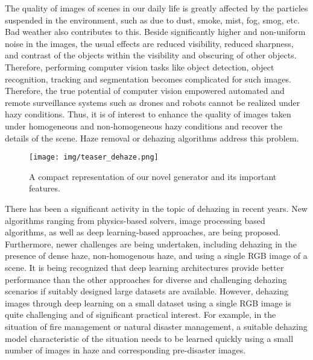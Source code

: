 \documentclass[runningheads]{llncs}
\begin{document}
The quality of images of scenes in our daily life is greatly affected by the particles suspended in the environment, such as due to dust, smoke, mist, fog, smog, etc. Bad weather also contributes to this. Beside significantly higher and non-uniform noise in the images, the usual effects are reduced visibility, reduced sharpness, and contrast of the objects within the visibility and obscuring of other objects. Therefore, performing computer vision tasks like object detection, object recognition, tracking and segmentation becomes complicated for such images. Therefore, the true potential of computer vision empowered automated and remote surveillance systems such as drones and robots cannot be realized under hazy conditions. Thus, it is of interest to enhance the quality of images taken under homogeneous and non-homogeneous hazy conditions and recover the details of the scene. Haze removal or dehazing algorithms address this problem.

\begin{figure}[t]
\centering
\texttt{[image: img/teaser\_dehaze.png]}
\vspace{-3pt}
\caption{A compact representation of our novel generator and its important features.}
\label{img:UNet}
\end{figure}

There has been a significant activity in the topic of dehazing in recent years. New algorithms ranging from physics-based solvers, image processing based algorithms, as well as deep learning-based approaches, are being proposed. Furthermore, newer challenges are being undertaken, including dehazing in the presence of dense haze, non-homogenous haze, and using a single RGB image of a scene. It is being recognized that deep learning architectures provide better performance than the other approaches for diverse and challenging dehazing scenarios if suitably designed large datasets are available. However, dehazing images through deep learning on a small dataset using a single RGB image is quite challenging and of significant practical interest. For example, in the situation of fire management or natural disaster management, a suitable dehazing model characteristic of the situation needs to be learned quickly using a small number of images in haze and corresponding pre-disaster images.
\end{document}
